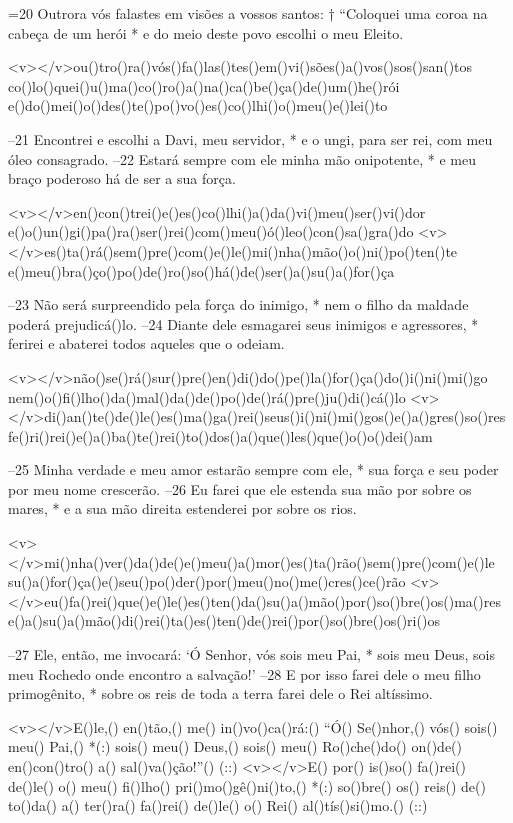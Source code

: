 =20 Outrora vós falastes em visões a vossos santos: †
“Coloquei uma coroa na cabeça de um herói *
e do meio deste povo escolhi o meu Eleito.

<v></v>ou()tro()ra()vós()fa()las()tes()em()vi()sões()a()vos()sos()san()tos
co()lo()quei()u()ma()co()ro()a()na()ca()be()ça()de()um()he()rói
e()do()mei()o()des()te()po()vo()es()co()lhi()o()meu()e()lei()to

–21 Encontrei e escolhi a Davi, meu servidor, *
e o ungi, para ser rei, com meu óleo consagrado.
–22 Estará sempre com ele minha mão onipotente, *
e meu braço poderoso há de ser a sua força.

<v></v>en()con()trei()e()es()co()lhi()a()da()vi()meu()ser()vi()dor
e()o()un()gi()pa()ra()ser()rei()com()meu()ó()leo()con()sa()gra()do
<v></v>es()ta()rá()sem()pre()com()e()le()mi()nha()mão()o()ni()po()ten()te
e()meu()bra()ço()po()de()ro()so()há()de()ser()a()su()a()for()ça

–23 Não será surpreendido pela força do inimigo, *
nem o filho da maldade poderá prejudicá()lo.
–24 Diante dele esmagarei seus inimigos e agressores, *
ferirei e abaterei todos aqueles que o odeiam.

<v></v>não()se()rá()sur()pre()en()di()do()pe()la()for()ça()do()i()ni()mi()go
nem()o()fi()lho()da()mal()da()de()po()de()rá()pre()ju()di()cá()lo
<v></v>di()an()te()de()le()es()ma()ga()rei()seus()i()ni()mi()gos()e()a()gres()so()res
fe()ri()rei()e()a()ba()te()rei()to()dos()a()que()les()que()o()o()dei()am

–25 Minha verdade e meu amor estarão sempre com ele, *
sua força e seu poder por meu nome crescerão.
–26 Eu farei que ele estenda sua mão por sobre os mares, *
e a sua mão direita estenderei por sobre os rios.

<v></v>mi()nha()ver()da()de()e()meu()a()mor()es()ta()rão()sem()pre()com()e()le
su()a()for()ça()e()seu()po()der()por()meu()no()me()cres()ce()rão
<v></v>eu()fa()rei()que()e()le()es()ten()da()su()a()mão()por()so()bre()os()ma()res
e()a()su()a()mão()di()rei()ta()es()ten()de()rei()por()so()bre()os()ri()os

–27 Ele, então, me invocará: ‘Ó Senhor, vós sois meu Pai, *
sois meu Deus, sois meu Rochedo onde encontro a salvação!’
–28 E por isso farei dele o meu filho primogênito, *
sobre os reis de toda a terra farei dele o Rei altíssimo.

<v></v>E()le,() en()tão,() me() in()vo()ca()rá:() ``Ó() Se()nhor,() vós() sois() meu() Pai,() *(:)
sois() meu() Deus,() sois() meu() Ro()che()do() on()de() en()con()tro() a() sal()va()ção!''() (::)
<v></v>E() por() is()so() fa()rei() de()le() o() meu() fi()lho() pri()mo()gê()ni()to,() *(:)
so()bre() os() reis() de() to()da() a() ter()ra() fa()rei() de()le() o() Rei() al()tís()si()mo.() (::)

